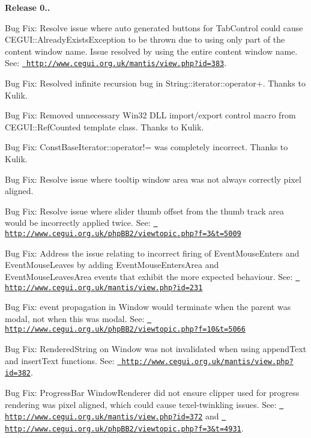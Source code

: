 {\bfseries{Release 0..}}
\begin{DoxyItemize}
\item Bug Fix\+: Resolve issue where auto generated buttons for Tab\+Control could cause C\+E\+G\+U\+I\+::\+Already\+Exists\+Exception to be thrown due to using only part of the content window name. Issue resolved by using the entire content window name. See\+: \href{http://www.cegui.org.uk/mantis/view.php?id=383}{\texttt{ http\+://www.\+cegui.\+org.\+uk/mantis/view.\+php?id=383}}.
\item Bug Fix\+: Resolved infinite recursion bug in String\+::iterator\+::operator+. Thanks to Kulik.
\item Bug Fix\+: Removed unnecessary Win32 D\+LL import/export control macro from C\+E\+G\+U\+I\+::\+Ref\+Counted template class. Thanks to Kulik.
\item Bug Fix\+: Const\+Base\+Iterator\+::operator!= was completely incorrect. Thanks to Kulik.
\item Bug Fix\+: Resolve issue where tooltip window area was not always correctly pixel aligned.
\item Bug Fix\+: Resolve issue where slider thumb offset from the thumb track area would be incorrectly applied twice. See\+: \href{http://www.cegui.org.uk/phpBB2/viewtopic.php?f=3&t=5009}{\texttt{ http\+://www.\+cegui.\+org.\+uk/php\+B\+B2/viewtopic.\+php?f=3\&t=5009}}
\item Bug Fix\+: Address the issue relating to \textquotesingle{}incorrect\textquotesingle{} firing of Event\+Mouse\+Enters and Event\+Mouse\+Leaves by adding Event\+Mouse\+Enters\+Area and Event\+Mouse\+Leaves\+Area events that exhibit the more expected behaviour. See\+: \href{http://www.cegui.org.uk/mantis/view.php?id=231}{\texttt{ http\+://www.\+cegui.\+org.\+uk/mantis/view.\+php?id=231}}
\item Bug Fix\+: event propagation in Window would terminate when the parent was modal, not when \textquotesingle{}this\textquotesingle{} was modal. See\+: \href{http://www.cegui.org.uk/phpBB2/viewtopic.php?f=10&t=5066}{\texttt{ http\+://www.\+cegui.\+org.\+uk/php\+B\+B2/viewtopic.\+php?f=10\&t=5066}}
\item Bug Fix\+: Rendered\+String on Window was not invalidated when using append\+Text and insert\+Text functions. See\+: \href{http://www.cegui.org.uk/mantis/view.php?id=382}{\texttt{ http\+://www.\+cegui.\+org.\+uk/mantis/view.\+php?id=382}}.
\item Bug Fix\+: Progress\+Bar Window\+Renderer did not ensure clipper used for progress rendering was pixel aligned, which could cause \textquotesingle{}texel-\/twinkling\textquotesingle{} issues. See\+: \href{http://www.cegui.org.uk/mantis/view.php?id=372}{\texttt{ http\+://www.\+cegui.\+org.\+uk/mantis/view.\+php?id=372}} and \href{http://www.cegui.org.uk/phpBB2/viewtopic.php?f=3&t=4931}{\texttt{ http\+://www.\+cegui.\+org.\+uk/php\+B\+B2/viewtopic.\+php?f=3\&t=4931}}.

\end{DoxyItemize}
